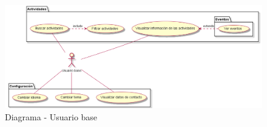 \begin{figure}[H]
	\centering
	\includegraphics[width=1\linewidth]{5-AnalisisDelSistemaDeInformacion/Casos de uso/usuarioBase/diagrama.png}
	\caption{Diagrama - Usuario base}
\end{figure}